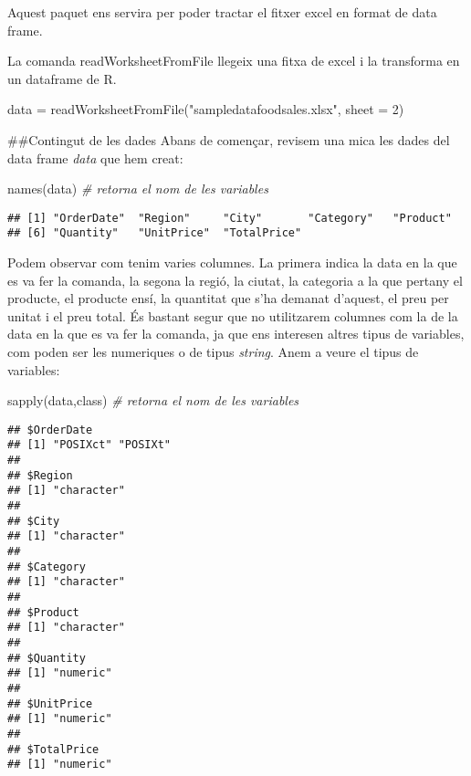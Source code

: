 \documentclass[
]{article}
\newenvironment{Shaded}{\begin{snugshade}}{\end{snugshade}}
\newcommand{\AttributeTok}[1]{\textcolor[rgb]{0.77,0.63,0.00}{#1}}
\newcommand{\CommentTok}[1]{\textcolor[rgb]{0.56,0.35,0.01}{\textit{#1}}}
\newcommand{\DecValTok}[1]{\textcolor[rgb]{0.00,0.00,0.81}{#1}}
\newcommand{\FunctionTok}[1]{\textcolor[rgb]{0.00,0.00,0.00}{#1}}
\newcommand{\NormalTok}[1]{#1}
\newcommand{\OtherTok}[1]{\textcolor[rgb]{0.56,0.35,0.01}{#1}}
\newcommand{\StringTok}[1]{\textcolor[rgb]{0.31,0.60,0.02}{#1}}
\begin{document}
Aquest paquet ens servira per poder tractar el fitxer excel en format de
data frame.

La comanda readWorksheetFromFile llegeix una fitxa de excel i la
transforma en un dataframe de R.

\begin{Shaded}
\begin{Highlighting}[]
\NormalTok{  data }\OtherTok{=} \FunctionTok{readWorksheetFromFile}\NormalTok{(}\StringTok{"sampledatafoodsales.xlsx"}\NormalTok{, }\AttributeTok{sheet =} \DecValTok{2}\NormalTok{)}
\end{Highlighting}
\end{Shaded}

\#\#Contingut de les dades Abans de començar, revisem una mica les dades
del data frame \emph{data} que hem creat:

\begin{Shaded}
\begin{Highlighting}[]
\FunctionTok{names}\NormalTok{(data) }\CommentTok{\# retorna el nom de les variables}
\end{Highlighting}
\end{Shaded}

\begin{verbatim}
## [1] "OrderDate"  "Region"     "City"       "Category"   "Product"   
## [6] "Quantity"   "UnitPrice"  "TotalPrice"
\end{verbatim}

Podem observar com tenim varies columnes. La primera indica la data en
la que es va fer la comanda, la segona la regió, la ciutat, la categoria
a la que pertany el producte, el producte ensí, la quantitat que s'ha
demanat d'aquest, el preu per unitat i el preu total. És bastant segur
que no utilitzarem columnes com la de la data en la que es va fer la
comanda, ja que ens interesen altres tipus de variables, com poden ser
les numeriques o de tipus \emph{string}. Anem a veure el tipus de
variables:

\begin{Shaded}
\begin{Highlighting}[]
\FunctionTok{sapply}\NormalTok{(data,class) }\CommentTok{\# retorna el nom de les variables}
\end{Highlighting}
\end{Shaded}

\begin{verbatim}
## $OrderDate
## [1] "POSIXct" "POSIXt" 
## 
## $Region
## [1] "character"
## 
## $City
## [1] "character"
## 
## $Category
## [1] "character"
## 
## $Product
## [1] "character"
## 
## $Quantity
## [1] "numeric"
## 
## $UnitPrice
## [1] "numeric"
## 
## $TotalPrice
## [1] "numeric"
\end{verbatim}
\end{document}
